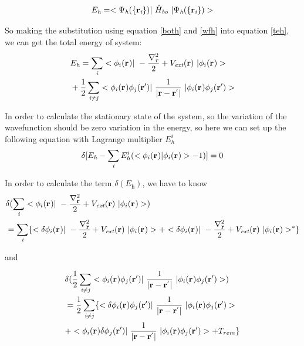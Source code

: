 \documentclass[a4paper, 12pt, titlepage,oneside,drop]{kthesis}
\begin{document}
\begin{equation}\label{teh}
E_{\textit{h}} = <\Psi_{\textit{h}}(\{\textbf{r}_{\textit{i}}\}) |\ {\hat{H}}_{\textit{bo}} \ | \Psi_{\textit{h}}(\{\textbf{r}_{\textit{i}}\})  >
\end{equation}

\noindent So making the substitution using equation \ref{both} and \ref{wfh} into equation \ref{teh}, we can get the total energy of system:
\begin{equation}\begin{split}
&E_\textit{h} = \sumi<i> <\bwf<i><> |\ -\frac{\nabla^{2}_{\textit r}}{2} + V_\textit{ext}(\textbf{r})  \ | \bwf<i><> > \\
& +\frac{1}{2} \suminj<i><j> <\bwf<i><> \bwfn<j><'>|\ \frac{1}{|\textbf{r} - \textbf{r}^{'} |} \ | \bwf<i><> \bwfn<j><'>>
\end{split}\end{equation}

\noindent In order to calculate the stationary state of the system, so the variation of the wavefunction should be
zero variation in the energy, so here we can set up the following equation with Lagrange multiplier $E^{i}_h$
\begin{equation}\label{haa}
 \delta [ E_{\textit{h}} - \sumi<i> E^{i}_{h} (<\bwf<i><> | \bwf<i><> > -1)] = 0 
\end{equation}

\noindent In order to calculate the term $\delta ( E_{\textit{h}} ) $, we have to know
\begin{equation}\begin{split}\label{hartree1}
& \delta ( \sumi<i> <\bwf<i><> |\ -\frac{\nabla^{2}_{\textbf r}}{2} + V_\textit{ext}(\textbf{r})  \ | \bwf<i><> > ) \\
&  = \sumi<i> \{ < \delta \bwf<i><> |\ -\frac{\nabla^{2}_{\textbf r}}{2} + V_\textit{ext}(\textbf{r})  \ | \bwf<i><> >  
   + <  \delta \bwf<i><> |\ -\frac{\nabla^{2}_{\textbf r}}{2} + V_\textit{ext}(\textbf{r})  \ |  \bwf<i><> >^{\ast} \}
\end{split}\end{equation}

\noindent and 

\begin{equation}\begin{split}\label{hartree2}
&  \delta( \frac{1}{2} \suminj<i><j> <\bwf<i><> \bwfn<j><'>|\ \frac{1}{|\textbf{r} - \textbf{r}^{'} |} \ | \bwf<i><> \bwfn<j><'>>)   \\
& =   \frac{1}{2} \suminj<i><j> \{  <\delta \bwf<i><> \bwfn<j><'>|\ \frac{1}{|\textbf{r} - \textbf{r}^{'} |} \ | \bwf<i><> \bwfn<j><'>>  \\
& +   < \bwf<i><> \delta \bwfn<j><'>|\ \frac{1}{|\textbf{r} - \textbf{r}^{'} |} \ | \bwf<i><> \bwfn<j><'>> +  T_{rem}\}
\end{split}\end{equation}
\end{document}

